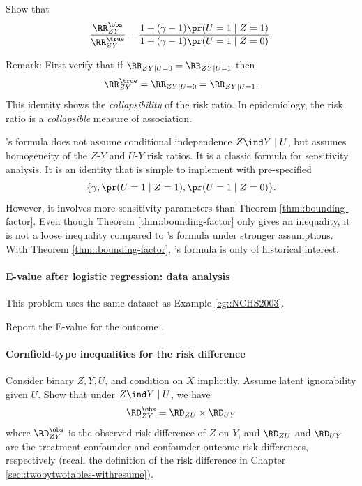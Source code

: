 Show that  
$$
\frac{\RR_{ZY}^{\obs}}{  \RR_{ZY}^{\true} } = \frac{1 + (  \gamma  -1)\pr(U=1\mid Z=1)  }
{ 1 + (  \gamma -1)\pr(U=1\mid Z=0) } .
$$ 




Remark: First verify that if  $\RR_{ZY|U=0} = \RR_{ZY|U=1}$ then 
$$
\RR_{ZY}^{\true}  = \RR_{ZY|U=0} = \RR_{ZY|U=1} . 
$$
This identity shows the {\it collapsibility} of the risk ratio. 
In epidemiology, the risk ratio is a {\it collapsible} measure of association.


 
\citet{Schlesselman::1978}'s formula does not assume conditional independence $Z\ind Y\mid U$, but assumes homogeneity of the $Z$-$Y$ and $U$-$Y$ risk ratios. It is a classic formula for sensitivity analysis. It is an identity that is simple to implement with pre-specified
$$
\{   \gamma  ,  \pr(U=1\mid Z=1), \pr(U=1\mid Z=0)  \} .
$$
However, it involves more sensitivity parameters than Theorem \ref{thm::bounding-factor}. Even though Theorem \ref{thm::bounding-factor} only gives an inequality, it is not a loose inequality compared to \citet{Schlesselman::1978}'s formula under stronger assumptions. With Theorem \ref{thm::bounding-factor},  \citet{Schlesselman::1978}'s formula is only of historical interest. 



 
\paragraph{E-value after logistic regression: data analysis}\label{hw::eg::NCHS2003}

This problem uses the same dataset as Example \ref{eg::NCHS2003}. 

Report the E-value for the outcome . 


\paragraph{Cornfield-type inequalities for the risk difference}\label{hw::cornfield-rd}



Consider binary $Z, Y, U$, and condition on $X$ implicitly. Assume latent ignorability given $U$.  Show that under $Z\ind Y\mid U$, we have
\begin{eqnarray}
\RD_{ZY}^\obs = \RD_{ZU} \times \RD_{UY}
\label{eq::cornfield-rd}
\end{eqnarray}
where $\RD_{ZY}^\obs$ is the observed risk difference of $Z$ on $Y$, and $\RD_{ZU}$ and $ \RD_{UY}$ are the treatment-confounder and confounder-outcome risk differences, respectively (recall the definition of the risk difference in Chapter \ref{sec::twobytwotables-withresume}). 


